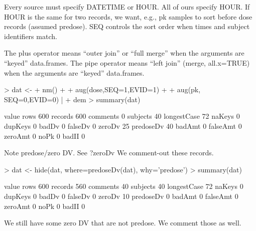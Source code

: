 Every source must specify DATETIME or HOUR.  All of ours specify HOUR.
If HOUR is the same for two records, we want, e.g., pk samples to sort 
before dose records (assumed predose).  SEQ controls the sort order 
when times and subject identifiers match.

The plus operator means ``outer join'' or ``full merge'' when the arguments are ``keyed'' data.frames.
The pipe operator means ``left join'' (merge, all.x=TRUE) when the arguments are ``keyed'' data.frames.
\begin{Schunk}
\begin{Sinput}
> dat <- 
+ 	nm() + 
+ 	aug(dose,SEQ=1,EVID=1) + 
+ 	aug(pk,  SEQ=0,EVID=0) | 
+ 	dem
> summary(dat)
\end{Sinput}
\begin{Soutput}
            value
rows          600
records       600
comments        0
subjects       40
longestCase    72
naKeys          0
dupKeys         0
badDv           0
falseDv         0
zeroDv         25
predoseDv      40
badAmt          0
falseAmt        0
zeroAmt         0
noPk            0
badII           0
\end{Soutput}
\end{Schunk}
Note predose/zero DV.
See ?zeroDv
We comment-out these records.
\begin{Schunk}
\begin{Sinput}
> dat <- hide(dat, where=predoseDv(dat), why='predose')
> summary(dat)
\end{Sinput}
\begin{Soutput}
            value
rows          600
records       560
comments       40
subjects       40
longestCase    72
naKeys          0
dupKeys         0
badDv           0
falseDv         0
zeroDv         10
predoseDv       0
badAmt          0
falseAmt        0
zeroAmt         0
noPk            0
badII           0
\end{Soutput}
\end{Schunk}
We still have some zero DV that are not predose.  We comment those as well.

